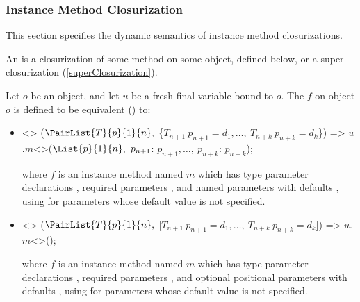 \documentclass[makeidx]{article}
\begin{document}
{\subsubsection{Instance Method Closurization}

\LMHash{}%
This section specifies the dynamic semantics of instance method closurizations.


\LMHash{}%
An 
is a closurization of some method on some object, defined below,
or a super closurization (\ref{superClosurization}).

\LMHash{}%
Let $o$ be an object, and let $u$ be a fresh final variable bound to $o$.
The  $f$ on object $o$
is defined to be equivalent
() to:
\begin{itemize}
\item
\begin{normativeDartCode}
<>
($\PairList{T}{p}{1}{n},\ $\{$T_{n+1}\ p_{n+1} = d_1, \ldots,\ T_{n+k}\ p_{n+k} = d_k$\}) =>
\quad$u$.$m$<>($\List{p}{1}{n},\ p_{n+1}$: $p_{n+1}, \ldots,\ p_{n+k}$: $p_{n+k}$);
\end{normativeDartCode}
where $f$ is an instance method named $m$
which has type parameter declarations
\TypeParametersStd,
required parameters ,
and named parameters  with defaults ,
using  for parameters whose default value is not specified.
\item
\begin{normativeDartCode}
<>
($\PairList{T}{p}{1}{n},\ $[$T_{n+1}\ p_{n+1} = d_1, \ldots,\ T_{n+k}\ p_{n+k} = d_k$]) =>
\quad$u$.$m$<>();
\end{normativeDartCode}
where $f$ is an instance method named $m$
which has type parameter declarations
\TypeParametersStd,
required parameters ,
and optional positional parameters
 with defaults ,
using  for parameters whose default value is not specified.
\end{itemize}

}
\end{document}
